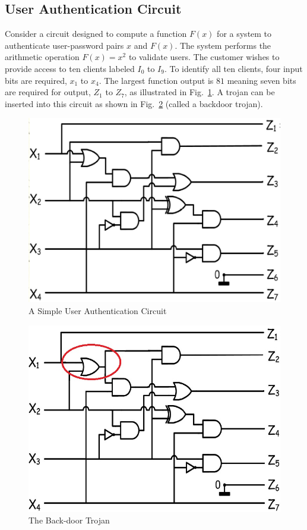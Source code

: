 \documentclass[journal, hidelinks]{IEEEtran}
\begin{document}
\subsection{User Authentication Circuit} \label{sec:userAuthentication}
Consider a circuit designed to compute a function $F(x)$ for a system to authenticate user-password pairs $x$ and $F(x)$.
The system performs the arithmetic operation $F(x) = x^2$ to validate users.
The customer wishes to provide access to ten clients labeled $I_0$ to $I_9$.
To identify all ten clients, four input bits are required, $x_1$ to $x_4$.
The largest function output is $81$ meaning seven bits are required for output, $Z_1$ to $Z_7$, as illustrated in Fig.~\ref{fig:userAuthenticationCircuit}.
A trojan can be inserted into this circuit as shown in Fig.~\ref{fig:userAuthenticationCircuitTrojan} (called a backdoor trojan).
\begin{figure}[h]
	\centering
	\includegraphics[width=0.7\linewidth]{Figures/circuit1}
	\caption{A Simple User Authentication Circuit}
	\label{fig:userAuthenticationCircuit}
\end{figure}
\begin{figure}[h]
	\centering
	\includegraphics[width=0.7\linewidth]{Figures/circuit2}
	\caption{The Back-door Trojan}
	\label{fig:userAuthenticationCircuitTrojan}
\end{figure}
\end{document}
